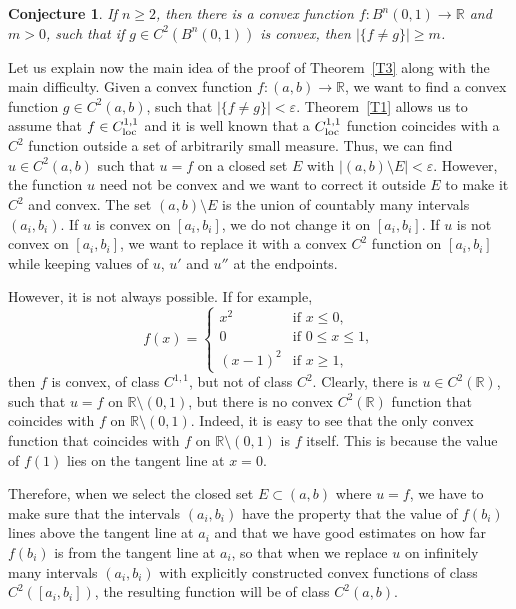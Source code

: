 \documentclass[intlimits,12pt,reqno]{amsart}
\newcommand{\bbbr}{\mathbb R}
\newcommand{\R}{\mathbb R}
\newcommand{\eps}{\varepsilon}
\newtheorem{conjecture}[theorem]{Conjecture}
\theoremstyle{definition}
\begin{document}
\begin{conjecture}
If $n\geq 2$, then there is a convex function $f:B^n(0,1)\to\R$ and $m>0$, such that if $g\in C^2(B^n(0,1))$ is convex, then
$|\{f\neq g\}|\geq m$.
\end{conjecture}

Let us explain now the main idea of the proof of Theorem~\ref{T3} along with the main difficulty. Given a convex function $f:(a,b)\to\bbbr$, we want to find a convex function $g\in C^2(a,b)$, such that $|\{f\neq g\}|<\eps$. Theorem~\ref{T1} allows us to assume that $f\in C^{1,1}_{\rm loc}$ and it is well known that a $C^{1,1}_{\rm loc}$ function coincides with a $C^2$ function outside a set of arbitrarily small measure. Thus, we can find $u\in C^2(a,b)$ such that $u=f$ on a closed set $E$ with $|(a,b)\setminus E|<\eps$. However, the function $u$ need not be convex and we want to correct it outside $E$ to make it $C^2$ and convex. The set $(a,b)\setminus E$ is the union of countably many intervals $(a_i,b_i)$. If $u$ is convex on $[a_i,b_i]$, we do not change it on $[a_i,b_i]$. If $u$ is not convex on $[a_i,b_i]$, we want to replace it with a convex $C^2$ function on $[a_i,b_i]$ while keeping values of $u$, $u'$ and $u''$ at the endpoints.

However, it is not always possible. If for example,
$$
f(x)=
\begin{cases}
x^2     & \text{if } x\leq 0,\\
0       & \text{if } 0\leq x\leq 1,\\
(x-1)^2 & \text{if } x\geq 1,
\end{cases}
$$
then $f$ is convex, of class $C^{1,1}$, but not of class $C^2$. Clearly, there is $u\in C^2(\bbbr)$, such that
$u=f$ on $\bbbr\setminus (0,1)$, but there is no convex $C^2(\bbbr)$ function that coincides with $f$ on $\bbbr\setminus (0,1)$. Indeed, it is easy to see that the only convex function that coincides with $f$ on $\bbbr\setminus (0,1)$ is $f$ itself. This is because the value of $f(1)$ lies on the tangent line at $x=0$.

Therefore, when we select the closed set $E\subset (a,b)$ where $u=f$, we have to make sure that the intervals $(a_i,b_i)$ have the property that the value of $f(b_i)$ lines above the tangent line at $a_i$ and that we have good estimates on how far $f(b_i)$ is from the tangent line at $a_i$, so that when we replace $u$ on infinitely many intervals $(a_i,b_i)$ with explicitly constructed convex functions of class $C^2([a_i,b_i])$, the resulting function will be of class $C^2(a,b)$.
\end{document}
